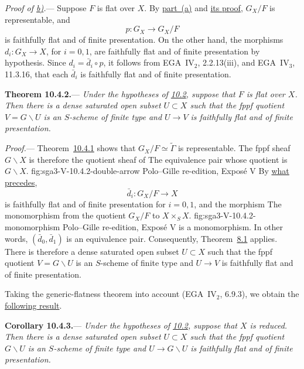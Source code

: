 \medskip
{}\label{proof:sga3-V-10.4.1-b}%
\noindent\textit{Proof of \hyperref[thm:sga3-V-10.4.1-b]{b)}.}---
Suppose \(F\) is flat over \(X\). By \hyperref[thm:sga3-V-10.4.1-a]{part~(a)} and \hyperref[proof:sga3-V-10.4.1-a]{its proof}, \(G_X/F\)
is representable, and
\[
  p:G_X\longrightarrow G_X/F
\]
is faithfully flat and of finite presentation. On the other hand,
the morphisms \(d_i:G_X\to X\), for \(i=0,1\), are faithfully flat
and of finite presentation by hypothesis. Since
\(d_i=\bar d_i\circ p\), it follows from EGA~IV\(_2\), 2.2.13(iii),
and EGA~IV\(_3\), 11.3.16, that each \(\bar d_i\) is faithfully flat
and of finite presentation.

\medskip
{}\label{thm:sga3-V-10.4.2}%
\noindent\textbf{Theorem 10.4.2.}---%
\textit{Under the hypotheses of \hyperref[sec:sga3-V-10.2]{10.2},
suppose that \(F\) is flat over \(X\). Then there is a dense saturated
open subset \(U\subset X\) such that the fppf quotient
\(V=G\backslash U\) is an \(S\)-scheme of finite type and
\(U\to V\) is faithfully flat and of finite presentation.}

\medskip
\noindent\textit{Proof.}---
Theorem~\hyperref[thm:sga3-V-10.4.1]{10.4.1} shows that
\(G_X/F\simeq\widetilde\Gamma\) is representable. The fppf sheaf
\(G\backslash X\) is therefore the quotient sheaf of
  {The equivalence pair whose quotient is \(G\backslash X\).}
  {fig:sga3-V-10.4.2-double-arrow}
  {Polo--Gille re-edition, Expos\'e V}
By \hyperref[thm:sga3-V-10.4.1-b]{what precedes},
\[
  \bar d_i:G_X/F\longrightarrow X
\]
is faithfully flat and of finite presentation for \(i=0,1\), and the
morphism
  {The monomorphism from the quotient \(G_X/F\) to \(X\times_SX\).}
  {fig:sga3-V-10.4.2-monomorphism}
  {Polo--Gille re-edition, Expos\'e V}
is a monomorphism. In other words, \((\bar d_0,\bar d_1)\) is an
equivalence pair. Consequently,
Theorem~\hyperref[thm:sga3-V-8.1]{8.1} applies. There is therefore a
dense saturated open subset \(U\subset X\) such that the fppf quotient
\(V=G\backslash U\) is an \(S\)-scheme of finite type and \(U\to V\)
is faithfully flat and of finite presentation.

Taking the generic-flatness theorem into account
(EGA~IV\(_2\), 6.9.3), we obtain the \hyperref[cor:sga3-V-10.4.3]{following result}.

\medskip
{}\label{cor:sga3-V-10.4.3}%
\noindent\textbf{Corollary 10.4.3.}---
\textit{Under the hypotheses of \hyperref[sec:sga3-V-10.2]{10.2},
suppose that \(X\) is reduced. Then there is a dense saturated open
subset \(U\subset X\) such that the fppf quotient
\(G\backslash U\) is an \(S\)-scheme of finite type and
\(U\to G\backslash U\) is faithfully flat and of finite
presentation.}

